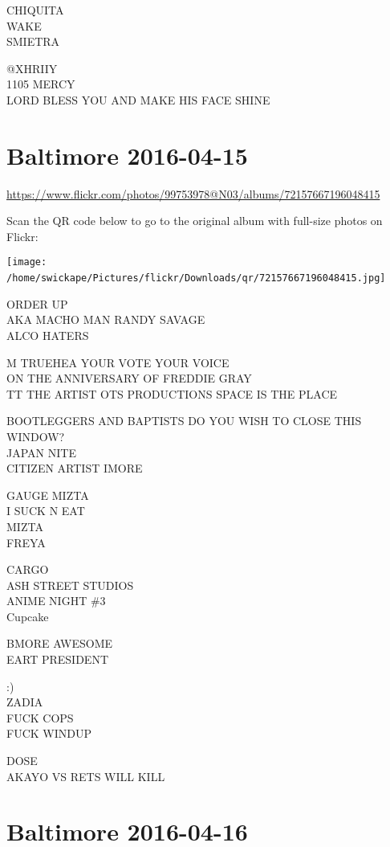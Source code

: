 \documentclass[10pt,letterpaper]{article}
\begin{document}
CHIQUITA\\
WAKE\\
SMIETRA

@XHRIIY\\
1105 MERCY\\
LORD BLESS YOU AND MAKE HIS FACE SHINE
\

\section*{Baltimore 2016-04-15}

\url{https://www.flickr.com/photos/99753978@N03/albums/72157667196048415}

Scan the QR code below to go to the original album with full-size photos on Flickr:

\texttt{[image: /home/swickape/Pictures/flickr/Downloads/qr/72157667196048415.jpg]}
\

ORDER UP\\
AKA MACHO MAN RANDY SAVAGE\\
ALCO HATERS

M TRUEHEA YOUR VOTE YOUR VOICE\\
ON THE ANNIVERSARY OF FREDDIE GRAY\\
TT THE ARTIST OTS PRODUCTIONS SPACE IS THE PLACE

BOOTLEGGERS AND BAPTISTS DO YOU WISH TO CLOSE THIS WINDOW?\\
JAPAN NITE\\
CITIZEN ARTIST IMORE

GAUGE MIZTA\\
I SUCK N EAT\\
MIZTA\\
FREYA

CARGO\\
ASH STREET STUDIOS\\
ANIME NIGHT \#3\\
Cupcake

BMORE AWESOME\\
EART PRESIDENT

:)\\
ZADIA\\
FUCK COPS\\
FUCK WINDUP

DOSE\\
AKAYO VS RETS WILL KILL
\

\section*{Baltimore 2016-04-16}
\end{document}
